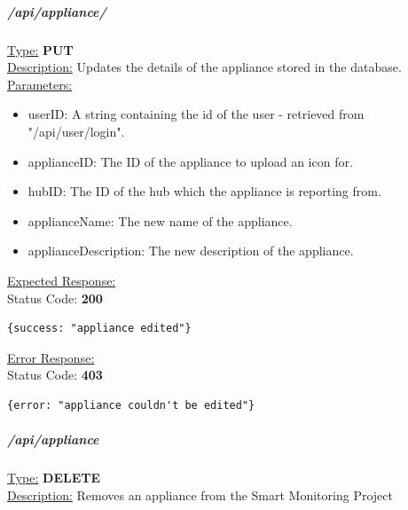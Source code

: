 \documentclass[preprint,12pt,3p]{elsarticle}
\newcommand{\forceindent}{\leavevmode{\parindent=1em\indent}}
\begin{document}
\subparagraph*{/api/appliance/}
\underline{Type:} \textbf{PUT}\\

\underline{Description:} Updates the details of the appliance stored in the database.\\

\underline{Parameters:}
\begin{itemize}
\item userID: A string containing the id of the user - retrieved from "/api/user/login".

\item applianceID: The ID of the appliance to upload an icon for.

\item hubID: The ID of the hub which the appliance is reporting from.

\item applianceName: The new name of the appliance.

\item applianceDescription: The new description of the appliance.
\end{itemize}

\underline{Expected Response:}\\[5pt]
\forceindent Status Code: \textbf{200} \\
\begin{verbatim}
{success: "appliance edited"}
\end{verbatim}
\underline{Error Response:}\\[5pt]
\forceindent Status Code: \textbf{403} \\
\begin{verbatim}
{error: "appliance couldn't be edited"}
\end{verbatim}

\subparagraph*{/api/appliance}
\underline{Type:} \textbf{DELETE}\\

\underline{Description:} Removes an appliance from the Smart Monitoring Project\\
\end{document}
